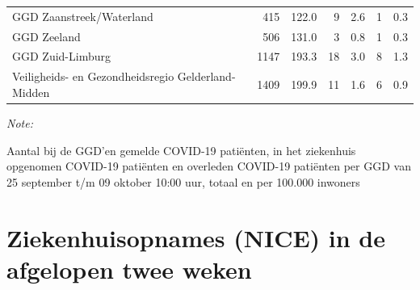 \documentclass[
  english,
  man,floatsintext]{apa6}
\begin{document}
\begin{table}
\begin{threeparttable}
\begin{tabular}{lrrrrrr}
GGD Zaanstreek/Waterland & 415 & 122.0 & 9 & 2.6 & 1 & 0.3\\
GGD Zeeland & 506 & 131.0 & 3 & 0.8 & 1 & 0.3\\
GGD Zuid-Limburg & 1147 & 193.3 & 18 & 3.0 & 8 & 1.3\\
Veiligheids- en Gezondheidsregio Gelderland-Midden & 1409 & 199.9 & 11 & 1.6 & 6 & 0.9\\
\bottomrule
\end{tabular}
\begin{tablenotes}
\item \textit{Note: } 
\item Aantal bij de GGD’en gemelde COVID-19 patiënten, in het ziekenhuis opgenomen COVID-19 patiënten en overleden COVID-19 patiënten per GGD van 25 september t/m 09 oktober 10:00 uur, totaal en per 100.000 inwoners
\end{tablenotes}
\end{threeparttable}
\endgroup{}
\end{table}

\newpage

\hypertarget{ziekenhuisopnames-nice-in-de-afgelopen-twee-weken}{%
\section{Ziekenhuisopnames (NICE) in de afgelopen twee weken}\label{ziekenhuisopnames-nice-in-de-afgelopen-twee-weken}}
\end{document}
